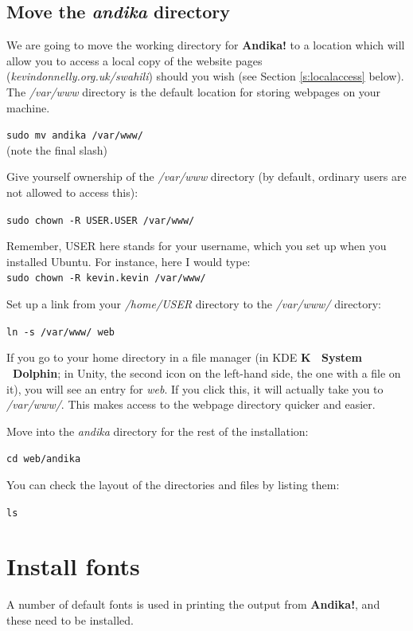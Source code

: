 \subsection{Move the \textit{andika} directory}

We are going to move the working directory for \textbf{Andika!} to a location which will allow you to access a local copy of the website pages (\textit{kevindonnelly.org.uk/swahili}) should you wish (see Section \ref{s:localaccess} below).  The \textit{/var/www} directory is the default location for storing webpages on your machine.

\verb|sudo mv andika /var/www/|\\
(note the final slash)

Give yourself ownership of the \textit{/var/www} directory (by default, ordinary users are not allowed to access this):

\verb|sudo chown -R USER.USER /var/www/|

Remember, USER here stands for your username, which you set up when you installed Ubuntu.  For instance, here I would type:\\
\verb|sudo chown -R kevin.kevin /var/www/|

Set up a link from your \textit{/home/USER} directory to the \textit{/var/www/} directory:

\verb|ln -s /var/www/ web|

If you go to your home directory in a file manager (in KDE \textbf{K \textrightarrow\ System \textrightarrow\ Dolphin}; in Unity, the second icon on the left-hand side, the one with a file on it), you will see an entry for \textit{web}.  If you click this, it will actually take you to \textit{/var/www/}.  This makes access to the webpage directory quicker and easier.

Move into the \textit{andika} directory for the rest of the installation:

\verb|cd web/andika|

You can check the layout of the directories and files by listing them:

\verb|ls|


\section{Install fonts}
\label{s:fonts}

A number of default fonts is used in printing the output from \textbf{Andika!}, and these need to be installed.

